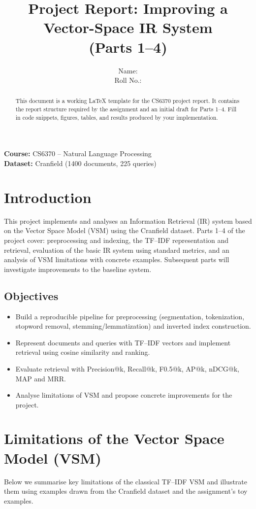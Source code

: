 \documentclass[11pt,a4paper]{article}
\title{Project Report: Improving a Vector-Space IR System\\(Parts 1--4)}
\author{Name: \underline{\hspace{6cm}} \\
Roll No.: \underline{\hspace{4cm}}}
\date{}
\begin{document}
\maketitle
\begin{center}
\textbf{Course:} CS6370 -- Natural Language Processing\\
\textbf{Dataset:} Cranfield (1400 documents, 225 queries)
\end{center}

\begin{abstract}
This document is a working LaTeX template for the CS6370 project report. It contains
the report structure required by the assignment and an initial draft for Parts 1--4.
Fill in code snippets, figures, tables, and results produced by your implementation.
\end{abstract}

\tableofcontents
\newpage

\section{Introduction}
This project implements and analyses an Information Retrieval (IR) system based on the
Vector Space Model (VSM) using the Cranfield dataset. Parts 1--4 of the project cover:
preprocessing and indexing, the TF--IDF representation and retrieval, evaluation of the
basic IR system using standard metrics, and an analysis of VSM limitations with concrete
examples. Subsequent parts will investigate improvements to the baseline system.

\subsection{Objectives}
\begin{itemize}[noitemsep]
  \item Build a reproducible pipeline for preprocessing (segmentation, tokenization,
    stopword removal, stemming/lemmatization) and inverted index construction.
  \item Represent documents and queries with TF--IDF vectors and implement retrieval
    using cosine similarity and ranking.
  \item Evaluate retrieval with Precision@k, Recall@k, F0.5@k, AP@k, nDCG@k, MAP and MRR.
  \item Analyse limitations of VSM and propose concrete improvements for the project.
\end{itemize}

\section{Limitations of the Vector Space Model (VSM)}
Below we summarise key limitations of the classical TF--IDF VSM and illustrate them
using examples drawn from the Cranfield dataset and the assignment's toy examples.
\end{document}

